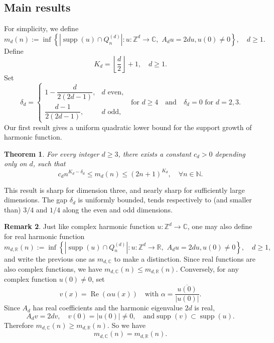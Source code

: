 \documentclass[11pt,reqno]{amsart}
\newcommand\N{\ensuremath{\mathbb{N}}}
\newcommand\R{\ensuremath{\mathbb{R}}}
\newcommand\Z{\ensuremath{\mathbb{Z}}}
\newcommand\C{\ensuremath{\mathbb{C}}}
\newcommand{\supp}{\operatorname{supp}}
\newtheorem{theorem}{Theorem}[section]
\theoremstyle{definition}
\newtheorem{remark}[theorem]{Remark}
\theoremstyle{plain}
\numberwithin{equation}{section}
\begin{document}
\subsection{Main results}
For simplicity, we define 
\begin{equation*}
    m_d(n):=\inf\left\{ |\supp(u)\cap Q_n^{(d)} |: u:\Z^d\to \C, \,\,A_du=2du, u(0)\neq 0\right\},\quad d\ge 1.
\end{equation*}
Define 
\begin{equation*}
    K_d=\left\lfloor \frac{d}{2}\right\rfloor+1,\quad d\ge 1.  
\end{equation*}
Set
\begin{equation*}
    \delta_d= \begin{cases}
  1-\dfrac{d}{2(2d-1)},&d\text{ even},\\
  \dfrac{d-1}{2(2d-1)},&d\text{ odd},
  \end{cases} \, \text{ for } d\ge 4 \quad \text{and}\quad  \delta_d=0 \text{ for } d=2,3.
\end{equation*}
Our first result gives a uniform quadratic lower bound for the support growth of harmonic function. 
\begin{theorem}\label{thm-quantitative}
    For every integer $d\ge 3$, there exists a constant $c_d>0$ depending only on $d$, such that
    \begin{equation*}
        c_d n^{K_d-\delta_d}\le m_d(n)\le(2n+1)^{K_d},\quad \forall n\in\N.
    \end{equation*}
\end{theorem}
This result is sharp for dimension three, and nearly sharp for sufficiently large dimensions. The gap $\delta_d$ is uniformly bounded, tends respectively to (and smaller than) $3/4$ and $1/4$ along the even and odd dimensions.

\begin{remark}\label{rmk:equivalence}
    Just like complex harmonic function $u:\Z^d\to \C$, one may also define for real harmonic function
    \begin{equation*}
        m_{d,\R}(n):=\inf\left\{ |\supp(u)\cap Q_n^{(d)} |: u:\Z^d\to \R, \,\,A_du=2du, u(0)\neq 0\right\},\quad d\ge 1,
    \end{equation*}
    and write the previous one as $m_{d,\C}$ to make a distinction. Since real functions are also complex functions, we have $m_{d,\C}(n)\le m_{d,\R}(n)$.
    Conversely, for any complex function $u(0)\neq 0$, set 
    $$v(x)=\operatorname{Re}(\alpha u(x)) \quad \text{with }\alpha=\frac{\overline{u(0)}}{|u(0)|}.$$ 
    Since $A_d$ has real coefficients and the harmonic eigenvalue $2d$ is real,
    \begin{equation*}
        A_dv=2dv, \quad v(0)=|u(0)|\neq 0, \quad \text{and} \supp(v)\subset\supp(u).
    \end{equation*}
    Therefore $m_{d,\C}(n)\ge m_{d,\R}(n)$.
    So we have
    \begin{equation*}
        m_{d,\C}(n)= m_{d,\R}(n).
    \end{equation*}
\end{remark}
\end{document}
